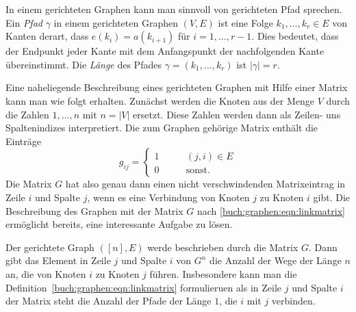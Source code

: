 In einem gerichteten Graphen kann man sinnvoll von gerichteten Pfad
sprechen.
%
Ein {\em Pfad} $\gamma$ in einem gerichteten Graphen $(V,E)$ ist eine Folge
$k_1,\dots,k_r\in E$ von Kanten derart, dass $e(k_i) = a(k_{i+1})$
für $i=1,\dots,r-1$.
Dies bedeutet, dass der Endpunkt jeder Kante mit dem Anfangspunkt der
nachfolgenden Kante übereinstimmt.
Die {\em Länge} des Pfades $\gamma=(k_1,\dots,k_r)$ ist $|\gamma|=r$.

Eine naheliegende Beschreibung eines gerichteten Graphen mit Hilfe einer
Matrix kann man wie folgt erhalten.
Zunächst werden die Knoten aus der Menge $V$ durch die Zahlen
$1,\dots,n$ mit $n=|V|$ ersetzt.
Diese Zahlen werden dann als Zeilen- uns Spaltenindizes interpretiert.
Die zum Graphen gehörige Matrix enthält die Einträge
\begin{equation}
g_{ij}
=
\begin{cases}
1&\qquad  (j,i) \in E\\
0&\qquad  \text{sonst.}
\end{cases}
\label{buch:graphen:eqn:linkmatrix}
\end{equation}
Die Matrix $G$ hat also genau dann einen nicht verschwindenden
Matrixeintrag in Zeile $i$ und Spalte $j$, wenn es eine Verbindung
von Knoten $j$ zu Knoten $i$ gibt.
Die Beschreibung des Graphen mit der Matrix $G$ nach
\eqref{buch:graphen:eqn:linkmatrix} ermöglicht bereits, eine interessante
Aufgabe zu lösen.

\begin{satz}
\label{buch:graphen:pfade-der-laenge-n}
Der gerichtete Graph $([n],E)$ werde beschrieben durch die Matrix $G$.
Dann gibt das Element in Zeile $j$ und Spalte $i$ von $G^n$ die Anzahl
der Wege der Länge $n$ an, die von Knoten $i$ zu Knoten $j$ führen.
Insbesondere kann man die Definition~\eqref{buch:graphen:eqn:linkmatrix}
formulieruen als in Zeile $j$ und Spalte $i$ der Matrix steht die Anzahl
der Pfade der Länge $1$, die $i$ mit $j$ verbinden.
\end{satz}

